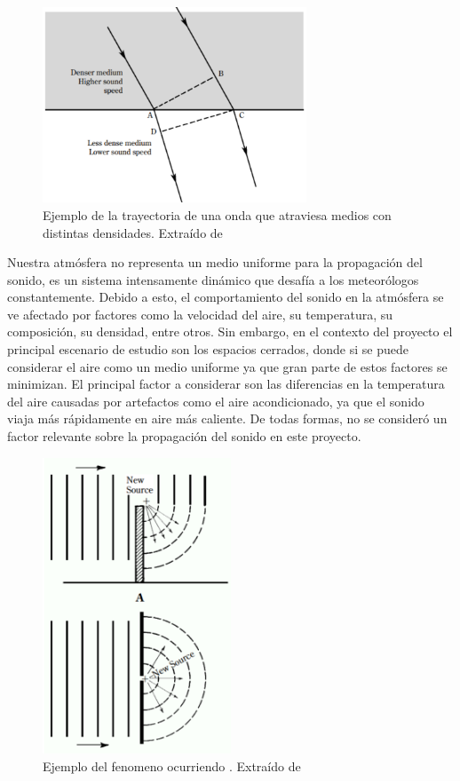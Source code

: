 \documentclass{prgrado}
\begin{document}
\begin{figure}[h!]
    \centering
    \includegraphics[width=0.7\textwidth]{figs/refraction.png}
    \captionsetup{justification=centering}
    \caption{Ejemplo de la trayectoria de una onda que atraviesa medios con distintas densidades. Extraído de \cite{Everest}}
    \label{fig:refraccion}
\end{figure}

Nuestra atmósfera no representa un medio uniforme para la propagación del sonido, es un sistema intensamente dinámico que desafía a los meteorólogos constantemente. Debido a esto, el comportamiento del sonido en la atmósfera se ve afectado por factores como la velocidad del aire, su temperatura, su composición, su densidad, entre otros. Sin embargo, en el contexto del proyecto el principal escenario de estudio son los espacios cerrados, donde si se puede considerar el aire como un medio uniforme ya que gran parte de estos factores se minimizan. El principal factor a considerar son las diferencias en la temperatura del aire causadas por artefactos como el aire acondicionado, ya que el sonido viaja más rápidamente en aire más caliente. De todas formas, no se consideró un factor relevante sobre la propagación del sonido en este proyecto.
\newpage
\begin{figure}
    \centering
    \includegraphics[width=0.5\textwidth]{figs/diffraction.png}
    \captionsetup{justification=centering}
    \caption{Ejemplo del fenomeno ocurriendo . Extraído de \cite{Everest}}
    \label{fig:difraccion}
\end{figure}
\end{document}
